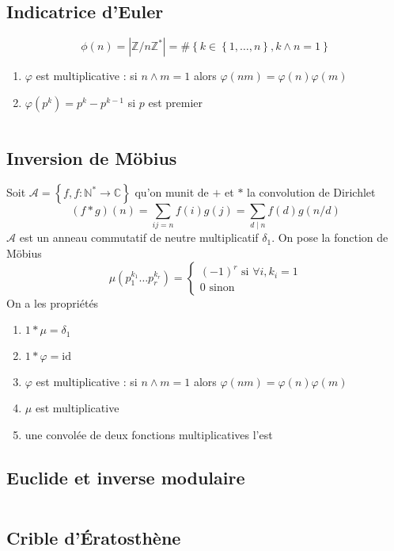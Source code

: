 \documentclass[10pt,twocolumn]{article}
\newcommand{\C}{\mathbb{C}}
\newcommand{\N}{\mathbb{N}}
\newcommand{\Z}{\mathbb{Z}}
\newcommand{\set}[1]{\left\lbrace #1 \right\rbrace}
\begin{document}
\subsection{Indicatrice d'Euler}
$$
    \phi(n) = |\Z/n\Z^*| = \#\set{k \in \set{1, \dots, n}, k \land n = 1}
$$
\begin{enumerate}
    \item $\varphi$ est multiplicative : si $n \land m = 1$ alors $\varphi(nm) = \varphi(n)\varphi(m)$
    \item $\varphi(p^k) = p^k - p^{k - 1}$ si $p$ est premier
\end{enumerate}
\inputminted[breaklines,tabsize=4]{cpp}{code/totient.cpp}

\subsection{Inversion de Möbius}
Soit $\mathcal A = \set{f, f : \N^* \to \C}$ qu'on munit de $+$ et $*$ la convolution de Dirichlet
$$
    (f * g)(n) = \sum_{ij = n} f(i)g(j) = \sum_{d \mid n} f(d)g(n/d)
$$
$\mathcal A$ est un anneau commutatif de neutre multiplicatif $\delta_1$. On pose la fonction de Möbius
$$
    \mu(p_1^{k_1} \dots p_r^{k_r}) = \left\{\begin{aligned}
        (-1)^r \text{ si } \forall i, k_i = 1 \\
        0 \text{ sinon}
    \end{aligned}\right.
$$
On a les propri\'et\'es
\begin{enumerate}
    \item $1 * \mu = \delta_1$
    \item $1 * \varphi = \mathrm{id}$
    \item $\varphi$ est multiplicative : si $n \land m = 1$ alors $\varphi(nm) = \varphi(n)\varphi(m)$
    \item $\mu$ est multiplicative
    \item une convol\'ee de deux fonctions multiplicatives l'est
\end{enumerate}

\subsection{Euclide et inverse modulaire}
\inputminted[breaklines,tabsize=4]{cpp}{code/euclid.cpp}

\subsection{Crible d'\'Eratosthène}
\inputminted[breaklines,tabsize=4]{cpp}{code/sieve.cpp}
\end{document}
